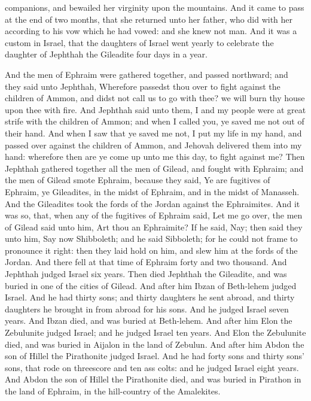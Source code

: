 companions, and bewailed her virginity upon the mountains. And it came to pass at the end of two months, that she returned unto her father, who did with her according to his vow which he had vowed: and she knew not man. And it was a custom in Israel, that the daughters of Israel went yearly to celebrate the daughter of Jephthah the Gileadite four days in a year. 

And the men of Ephraim were gathered together, and passed northward; and they said unto Jephthah, Wherefore passedst thou over to fight against the children of Ammon, and didst not call us to go with thee? we will burn thy house upon thee with fire. And Jephthah said unto them, I and my people were at great strife with the children of Ammon; and when I called you, ye saved me not out of their hand. And when I saw that ye saved me not, I put my life in my hand, and passed over against the children of Ammon, and Jehovah delivered them into my hand: wherefore then are ye come up unto me this day, to fight against me? Then Jephthah gathered together all the men of Gilead, and fought with Ephraim; and the men of Gilead smote Ephraim, because they said, Ye are fugitives of Ephraim, ye Gileadites, in the midst of Ephraim, and in the midst of Manasseh. And the Gileadites took the fords of the Jordan against the Ephraimites. And it was so, that, when any of the fugitives of Ephraim said, Let me go over, the men of Gilead said unto him, Art thou an Ephraimite? If he said, Nay; then said they unto him, Say now Shibboleth; and he said Sibboleth; for he could not frame to pronounce it right: then they laid hold on him, and slew him at the fords of the Jordan. And there fell at that time of Ephraim forty and two thousand.  And Jephthah judged Israel six years. Then died Jephthah the Gileadite, and was buried in one of the cities of Gilead.  And after him Ibzan of Beth-lehem judged Israel. And he had thirty sons; and thirty daughters he sent abroad, and thirty daughters he brought in from abroad for his sons. And he judged Israel seven years. And Ibzan died, and was buried at Beth-lehem.  And after him Elon the Zebulunite judged Israel; and he judged Israel ten years. And Elon the Zebulunite died, and was buried in Aijalon in the land of Zebulun.  And after him Abdon the son of Hillel the Pirathonite judged Israel. And he had forty sons and thirty sons’ sons, that rode on threescore and ten ass colts: and he judged Israel eight years. And Abdon the son of Hillel the Pirathonite died, and was buried in Pirathon in the land of Ephraim, in the hill-country of the Amalekites. 

